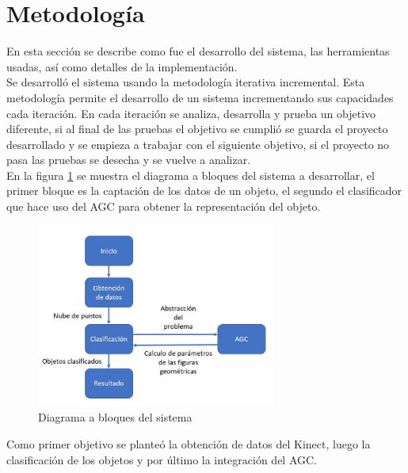 \section{Metodología}

En esta sección se describe como fue el desarrollo del sistema, las herramientas usadas, así como detalles de la implementación. \\

Se desarrolló el sistema usando la metodología iterativa incremental. Esta metodología permite el desarrollo de un sistema incrementando sus capacidades cada iteración. En cada iteración se analiza, desarrolla y prueba un objetivo diferente, si al final de las pruebas el objetivo se cumplió se guarda el proyecto desarrollado y se empieza a trabajar con el siguiente objetivo, si el proyecto no pasa las pruebas se desecha y se vuelve a analizar.\\

En la figura \ref{fig:arquitectura} se muestra el diagrama a bloques del sistema a desarrollar, el primer bloque es la captación de los datos de un objeto, el segundo el clasificador que hace uso del AGC para obtener la representación del objeto.\\

    \begin{figure}[!htb] 
        \centering
        \includegraphics[width=0.7\textwidth]{01Introduccion/imagenes/arquitectura_del_sistema.JPG}
        \caption{Diagrama a bloques del sistema}
        \label{fig:arquitectura}
    \end{figure}


Como primer objetivo se planteó la obtención de datos del Kinect, luego la clasificación de los objetos y por último la integración del AGC.\\
